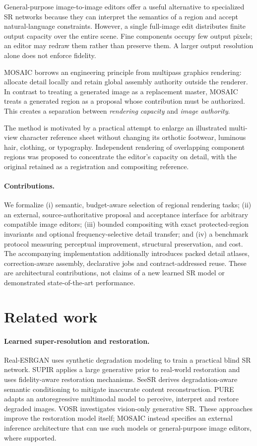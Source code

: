 \documentclass[10pt,twocolumn]{article}
\begin{document}
General-purpose image-to-image editors offer a useful alternative to specialized SR networks because they can interpret the semantics of a region and accept natural-language constraints. However, a single full-image edit distributes finite output capacity over the entire scene. Fine components occupy few output pixels; an editor may redraw them rather than preserve them. A larger output resolution alone does not enforce fidelity.

MOSAIC borrows an engineering principle from multipass graphics rendering: allocate detail locally and retain global assembly authority outside the renderer. In contrast to treating a generated image as a replacement master, MOSAIC treats a generated region as a proposal whose contribution must be authorized. This creates a separation between \emph{rendering capacity} and \emph{image authority}.

The method is motivated by a practical attempt to enlarge an illustrated multi-view character reference sheet without changing its orthotic footwear, luminous hair, clothing, or typography. Independent rendering of overlapping component regions was proposed to concentrate the editor's capacity on detail, with the original retained as a registration and compositing reference.

\paragraph{Contributions.} We formalize (i) semantic, budget-aware selection of regional rendering tasks; (ii) an external, source-authoritative proposal and acceptance interface for arbitrary compatible image editors; (iii) bounded compositing with exact protected-region invariants and optional frequency-selective detail transfer; and (iv) a benchmark protocol measuring perceptual improvement, structural preservation, and cost. The accompanying implementation additionally introduces packed detail atlases, correction-aware assembly, declarative jobs and contract-addressed reuse. These are architectural contributions, not claims of a new learned SR model or demonstrated state-of-the-art performance.
\section{Related work}
\paragraph{Learned super-resolution and restoration.} Real-ESRGAN \cite{realesr} uses synthetic degradation modeling to train a practical blind SR network. SUPIR \cite{supir} applies a large generative prior to real-world restoration and uses fidelity-aware restoration mechanisms. SeeSR \cite{seesr} derives degradation-aware semantic conditioning to mitigate inaccurate content reconstruction. PURE \cite{pure} adapts an autoregressive multimodal model to perceive, interpret and restore degraded images. VOSR \cite{vosr} investigates vision-only generative SR. These approaches improve the restoration model itself; MOSAIC instead specifies an external inference architecture that can use such models or general-purpose image editors, where supported.
\end{document}

